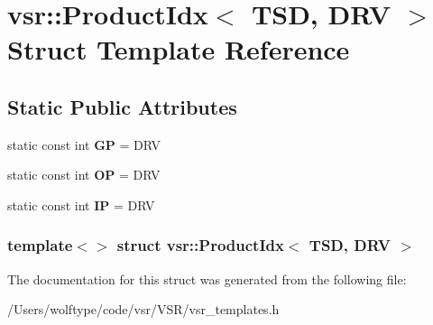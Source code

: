 \hypertarget{structvsr_1_1_product_idx_3_01_t_s_d_00_01_d_r_v_01_4}{\section{vsr\-:\-:Product\-Idx$<$ T\-S\-D, D\-R\-V $>$ Struct Template Reference}
\label{structvsr_1_1_product_idx_3_01_t_s_d_00_01_d_r_v_01_4}
}
\subsection*{Static Public Attributes}
\begin{DoxyCompactItemize}
\item 
\hypertarget{structvsr_1_1_product_idx_3_01_t_s_d_00_01_d_r_v_01_4_ab2e27346bf088b94080f43200ce9a31f}{static const int {\bfseries G\-P} = D\-R\-V}\label{structvsr_1_1_product_idx_3_01_t_s_d_00_01_d_r_v_01_4_ab2e27346bf088b94080f43200ce9a31f}

\item 
\hypertarget{structvsr_1_1_product_idx_3_01_t_s_d_00_01_d_r_v_01_4_a63e2590ce9cf91b23b9869d5bb635130}{static const int {\bfseries O\-P} = D\-R\-V}\label{structvsr_1_1_product_idx_3_01_t_s_d_00_01_d_r_v_01_4_a63e2590ce9cf91b23b9869d5bb635130}

\item 
\hypertarget{structvsr_1_1_product_idx_3_01_t_s_d_00_01_d_r_v_01_4_aab19a3e66c3f103e248b1d4e5cef7746}{static const int {\bfseries I\-P} = D\-R\-V}\label{structvsr_1_1_product_idx_3_01_t_s_d_00_01_d_r_v_01_4_aab19a3e66c3f103e248b1d4e5cef7746}

\end{DoxyCompactItemize}
\subsubsection*{template$<$$>$ struct vsr\-::\-Product\-Idx$<$ T\-S\-D, D\-R\-V $>$}



The documentation for this struct was generated from the following file\-:\begin{DoxyCompactItemize}
\item 
/\-Users/wolftype/code/vsr/\-V\-S\-R/vsr\-\_\-templates.\-h\end{DoxyCompactItemize}
